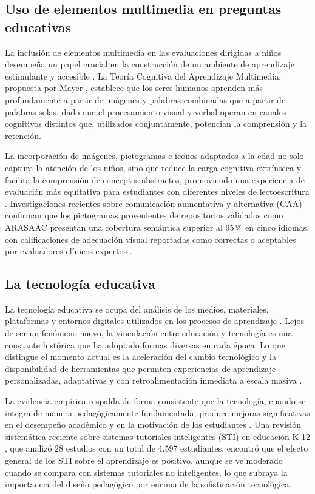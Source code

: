 \subsection{Uso de elementos multimedia en preguntas educativas}

La inclusión de elementos multimedia en las evaluaciones dirigidas a niños desempeña un papel crucial en la construcción de un ambiente de aprendizaje estimulante y accesible \cite{mayer2014multimedia}. La Teoría Cognitiva del Aprendizaje Multimedia, propuesta por Mayer \cite{mayer2014multimedia}, establece que los seres humanos aprenden más profundamente a partir de imágenes y palabras combinadas que a partir de palabras solas, dado que el procesamiento visual y verbal operan en canales cognitivos distintos que, utilizados conjuntamente, potencian la comprensión y la retención.

La incorporación de imágenes, pictogramas e íconos adaptados a la edad no solo captura la atención de los niños, sino que reduce la carga cognitiva extrínseca y facilita la comprensión de conceptos abstractos, promoviendo una experiencia de evaluación más equitativa para estudiantes con diferentes niveles de lectoescritura \cite{mayer2014multimedia,guillomia2021cognitive}. Investigaciones recientes sobre comunicación aumentativa y alternativa (CAA) confirman que los pictogramas provenientes de repositorios validados como ARASAAC presentan una cobertura semántica superior al 95\,\% en cinco idiomas, con calificaciones de adecuación visual reportadas como correctas o aceptables por evaluadores clínicos expertos \cite{guillomia2021cognitive}.

\subsection{La tecnología educativa}

La tecnología educativa se ocupa del análisis de los medios, materiales, plataformas y entornos digitales utilizados en los procesos de aprendizaje \cite{sayed2023adaptive}. Lejos de ser un fenómeno nuevo, la vinculación entre educación y tecnología es una constante histórica que ha adoptado formas diversas en cada época. Lo que distingue el momento actual es la aceleración del cambio tecnológico y la disponibilidad de herramientas que permiten experiencias de aprendizaje personalizadas, adaptativas y con retroalimentación inmediata a escala masiva \cite{topali2025aied}.

La evidencia empírica respalda de forma consistente que la tecnología, cuando se integra de manera pedagógicamente fundamentada, produce mejoras significativas en el desempeño académico y en la motivación de los estudiantes \cite{debrenti2024gbl,maskos2025fa}. Una revisión sistemática reciente sobre sistemas tutoriales inteligentes (STI) en educación K-12 \cite{mousavinasab2018its}, que analizó 28 estudios con un total de 4.597 estudiantes, encontró que el efecto general de los STI sobre el aprendizaje es positivo, aunque se ve moderado cuando se compara con sistemas tutoriales no inteligentes, lo que subraya la importancia del diseño pedagógico por encima de la sofisticación tecnológica.

